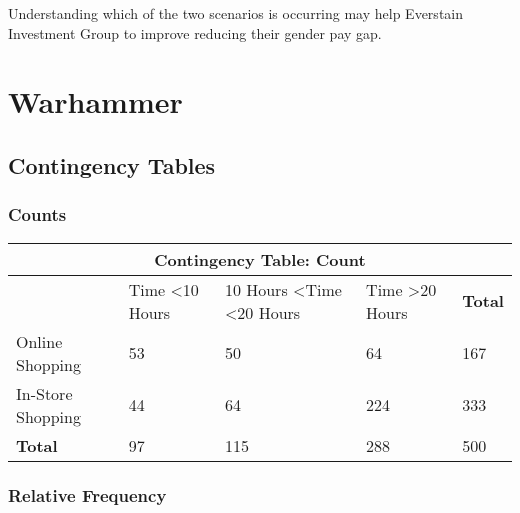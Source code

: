\documentclass[11pt]{article}
\begin{document}
Understanding which of the two scenarios is occurring may help Everstain Investment Group to improve reducing their gender pay gap.
\newpage
\section{Warhammer}
\subsection{Contingency Tables}
\subsubsection{Counts}


\begin{table}[hbt]
\centering
\begin{adjustbox}{max width=\columnwidth}
\begin{tabular}{@{}lllll@{}}
\toprule
\multicolumn{5}{c}{\textbf{Contingency Table: Count}}                                                                                  \\ \midrule
                  & Time \textless 10 Hours & 10 Hours \textless Time \textless 20 Hours & Time \textgreater 20 Hours & \textbf{Total} \\
Online Shopping   & 53                      & 50                                         & 64                         & 167            \\
In-Store Shopping & 44                      & 64                                         & 224                        & 333            \\
\textbf{Total}    & 97                      & 115                                        & 288                        & 500            \\ \bottomrule
\end{tabular}
\end{adjustbox}
\end{table}

\subsubsection{Relative Frequency}
\end{document}
